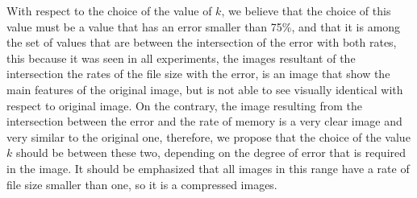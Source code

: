 \documentclass[journal]{IEEEtran}
\begin{document}
With respect to the choice of the value of $k$, we believe that the choice of this value must be a value that has an error smaller than 75\%, and that it is among the set of values that are between the intersection of the error with both rates, this because it was seen in all experiments, the images resultant of the intersection the rates of the file size with the error, is an image that show the main features of the original image, but is not able to see visually identical with respect to original image. 
On the contrary, the image resulting from the intersection between the error and the rate of memory is a very clear image and very similar to the original one, therefore, we propose that the choice of the value $k$ should be between these two, depending on the degree of error that is required in the image. It should be emphasized that all images in this range have a rate of file size smaller than one, so it is a compressed images.





	
	
\end{document}
